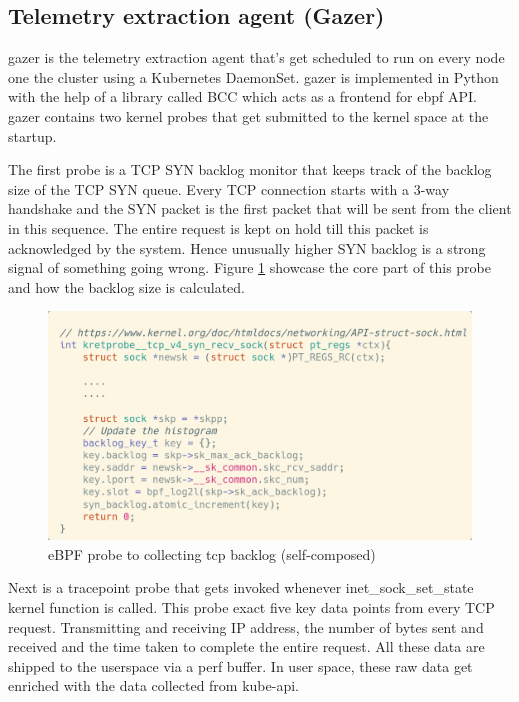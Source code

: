 \subsection{Telemetry extraction agent (Gazer)}

\ac{gazer} is the telemetry extraction agent that's get scheduled to run on every node one the cluster using a Kubernetes DaemonSet. \ac{gazer} is implemented in Python with the help of a library called BCC which acts as a frontend for \ac{ebpf} API. \ac{gazer} contains two kernel probes that get submitted to the kernel space at the startup. 

The first probe is a TCP SYN backlog monitor that keeps track of the backlog size of the TCP SYN queue. Every TCP connection starts with a 3-way handshake and the SYN packet is the first packet that will be sent from the client in this sequence. The entire request is kept on hold till this packet is acknowledged by the system. Hence unusually higher SYN backlog is a strong signal of something going wrong. Figure \ref{fig:backlog-probe} showcase the core part of this probe and how the backlog size is calculated.

\begin{figure}[H]
    \includegraphics[width=14cm]{assets/implementation/backlog-probe.png}
    \caption{eBPF probe to collecting tcp backlog (self-composed)}
    \label{fig:backlog-probe}
\end{figure}

Next is a tracepoint probe that gets invoked whenever inet\_sock\_set\_state kernel function is called. This probe exact five key data points from every TCP request. Transmitting and receiving IP address, the number of bytes sent and received and the time taken to complete the entire request. All these data are shipped to the userspace via a perf buffer. In user space, these raw data get enriched with the data collected from kube-api. 

